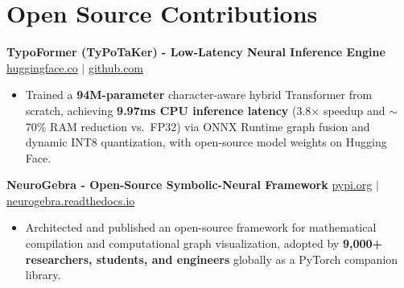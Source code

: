\documentclass[9.5pt,a4paper]{article}
\begin{document}
\section*{Open Source Contributions}
\noindent
\textbf{TypoFormer (TyPoTaKer) - Low-Latency Neural Inference Engine} \hfill \href{https://huggingface.co/fahiiim/TypoFormer}{huggingface.co} $\vert$ \href{https://github.com/fahiiim/TyPoTaKer}{github.com}
\begin{itemize}
    \item Trained a \textbf{94M-parameter} character-aware hybrid Transformer from scratch, achieving \textbf{9.97ms CPU inference latency} (3.8$\times$ speedup and $\sim$70\% RAM reduction vs.\ FP32) via ONNX Runtime graph fusion and dynamic INT8 quantization, with open-source model weights on Hugging Face.
\end{itemize}
\vspace{0.6pt}
\noindent
\textbf{NeuroGebra - Open-Source Symbolic-Neural Framework} \hfill \href{https://pypi.org/project/neurogebra/}{pypi.org} $\vert$ \href{https://neurogebra.readthedocs.io}{neurogebra.readthedocs.io}
\begin{itemize}
    \item Architected and published an open-source framework for mathematical compilation and computational graph visualization, adopted by \textbf{9,000+ researchers, students, and engineers} globally as a PyTorch companion library.
\end{itemize}
\vspace{0.6pt}
\end{document}
